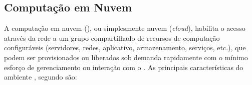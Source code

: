 



\subsection{Computação em Nuvem}

A computação em nuvem (\cloud), ou simplesmente nuvem
(\emph{cloud}), habilita o acesso através da rede a um grupo compartilhado de
recursos de computação configuráveis (servidores, redes, aplicativo,
armazenamento, serviços, etc.), que podem ser provisionados ou liberados sob
demanda rapidamente com o mínimo esforço de gerenciamento ou interação com o
 \cite{NIST2011}.
As principais características do ambiente \cloud, segundo 
são:


